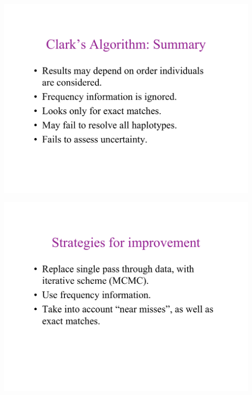 \newslide{}
\mbox{}
\vspace*{\VertUp}
\enlargethispage*{1000pt}
\begin{center}
\includegraphics*[width=\textwidth]{PPT_pages/pg_0031.pdf}
\end{center}


\newslide{}
\mbox{}
\vspace*{\VertUp}
\enlargethispage*{1000pt}
\begin{center}
\includegraphics*[width=\textwidth]{PPT_pages/pg_0032.pdf}
\end{center}


